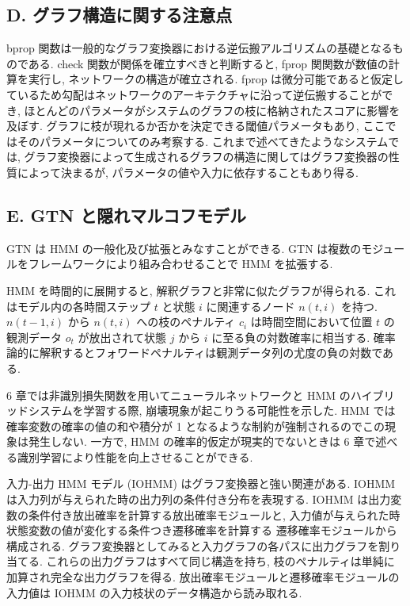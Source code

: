 \documentclass[twocolumn]{jarticle}     %
\begin{document}
\subsection*{D. グラフ構造に関する注意点}
bprop 関数は一般的なグラフ変換器における逆伝搬アルゴリズムの基礎となるものである. check 関数が関係を確立すべきと判断すると, fprop 関関数が数値の計算を実行し, ネットワークの構造が確立される. 
fprop は微分可能であると仮定しているため勾配はネットワークのアーキテクチャに沿って逆伝搬することができ, ほとんどのパラメータがシステムのグラフの枝に格納されたスコアに影響を及ぼす. グラフに枝が現れるか否かを決定できる閾値パラメータもあり, ここではそのパラメータについてのみ考察する. 
これまで述べてきたようなシステムでは, グラフ変換器によって生成されるグラフの構造に関してはグラフ変換器の性質によって決まるが, パラメータの値や入力に依存することもあり得る.

\subsection*{E. GTN と隠れマルコフモデル}
GTN は HMM の一般化及び拡張とみなすことができる. GTN は複数のモジュールをフレームワークにより組み合わせることで HMM を拡張する.
\par
HMM を時間的に展開すると, 解釈グラフと非常に似たグラフが得られる. これはモデル内の各時間ステップ $t$ と状態 $i$ に関連するノード $n(t,i)$ を持つ.  $n(t-1, i)$ から $n(t, i)$ への枝のペナルティ $c_i$ は時間空間において位置 $t$ の観測データ $o_t$ が放出されて状態 $j$ から $i$ に至る負の対数確率に相当する. 確率論的に解釈するとフォワードペナルティは観測データ列の尤度の負の対数である. 
\par
6 章では非識別損失関数を用いてニューラルネットワークと HMM のハイブリッドシステムを学習する際, 崩壊現象が起こりうる可能性を示した. 
HMM では確率変数の確率の値の和や積分が 1 となるような制約が強制されるのでこの現象は発生しない. 
一方で, HMM の確率的仮定が現実的でないときは 6 章で述べる識別学習により性能を向上させることができる. 
\par
入力-出力 HMM モデル (IOHMM) はグラフ変換器と強い関連がある. IOHMM は入力列が与えられた時の出力列の条件付き分布を表現する. 
IOHMM は出力変数の条件付き放出確率を計算する放出確率モジュールと, 入力値が与えられた時状態変数の値が変化する条件つき遷移確率を計算する
遷移確率モジュールから構成される. グラフ変換器としてみると入力グラフの各パスに出力グラフを割り当てる. これらの出力グラフはすべて同じ構造を持ち, 枝のペナルティは単純に加算され完全な出力グラフを得る. 放出確率モジュールと遷移確率モジュールの入力値は IOHMM の入力枝状のデータ構造から読み取れる. 
\end{document}
